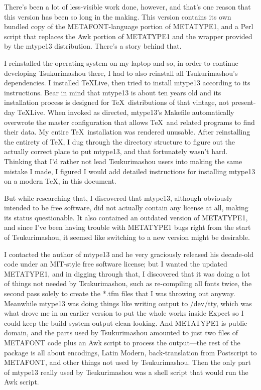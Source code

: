 \documentclass[14pt]{extarticle}
\begin{document}
There's been a lot of less-visible work done, however, and that's one reason
that this version has been so long in the making.  This version contains its
own bundled copy of the METAFONT-language portion of METATYPE1, and a Perl
script that replaces the Awk portion of METATYPE1 and the wrapper provided
by the mtype13 distribution.  There's a story behind that.

I reinstalled the operating system on my laptop and so, in order to
continue developing Tsukurimashou there, I had to also reinstall all
Tsukurimashou's dependencies.  I installed \TeX{}Live, then tried to
install mtype13 according to its instructions.  Bear in mind that
mtype13 is about ten years old and its installation process is designed
for \TeX\ distributions of that vintage, not present-day \TeX{}Live. 
When invoked as directed, mtype13's Makefile automatically overwrote
the master configuration that allows \TeX\ and related programs to find
their data.  My entire \TeX\ installation was rendered unusable.  After
reinstalling the entirety of \TeX, I dug through the directory
structure to figure out the actually correct place to put mtype13, and
that fortunately wasn't hard.  Thinking that I'd rather not lead
Tsukurimashou users into making the same mistake I made, I figured I
would add detailed instructions for installing mtype13 on a modern
\TeX, in this document.

But while researching that, I discovered that mtype13, although
obviously intended to be free software, did not actually contain any
license at all, making its status questionable.  It also contained an
outdated version of METATYPE1, and since I've been having trouble with
METATYPE1 bugs right from the start of Tsukurimashou, it seemed like
switching to a new version might be desirable.

I contacted the author of mtype13 and he very graciously released his
decade-old code under an MIT-style free software license; but I wanted
the updated METATYPE1, and in digging through that, I discovered that
it was doing a lot of things not needed by Tsukurimashou, such as
re-compiling all fonts twice, the second pass solely to create the
*.tfm files that I was throwing out anyway.  Meanwhile mtype13 was
doing things like writing output to /dev/tty, which was what drove me
in an earlier version to put the whole works inside Expect so I could
keep the build system output clean-looking.  And METATYPE1 is public
domain, and the parts used by Tsukurimashou amounted to just two files
of METAFONT code plus an Awk script to process the output---the rest of
the package is all about encodings, Latin Modern, back-translation from
Postscript to METAFONT, and other things not used by Tsukurimashou. 
Then the only part of mtype13 really used by Tsukurimashou was a shell
script that would run the Awk script.
\end{document}
